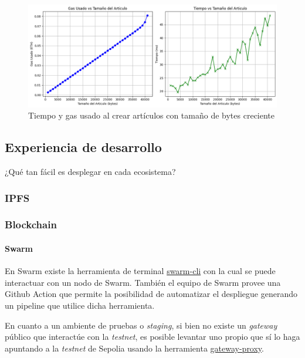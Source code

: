 \begin{figure}[H]
    \centering
    \includegraphics[width=1\linewidth]{img/aw-eth-bytes-articulo-incremental.png}
    \caption{Tiempo y gas usado al crear artículos con tamaño de bytes creciente}
    \label{fig:aw-eth-bytes-articulo-incremental.png}
\end{figure}

\subsection{Experiencia de desarrollo} %

¿Qué tan fácil es desplegar en cada ecosistema?

\subsubsection{IPFS}

\subsubsection{Blockchain}

\paragraph{Swarm}
En Swarm existe la herramienta de terminal \href{https://github.com/ethersphere/swarm-cli}{swarm-cli} con la cual se puede interactuar con un nodo de Swarm. También el equipo de Swarm provee una Github Action que permite la posibilidad de automatizar el despliegue generando un pipeline que utilice dicha herramienta.

En cuanto a un ambiente de pruebas o \textit{staging}, si bien no existe un \textit{gateway} público que interactúe con la \textit{testnet}, es posible levantar uno propio que sí lo haga apuntando a la \textit{testnet} de Sepolia usando la herramienta \href{https://github.com/ethersphere/gateway-proxy}{gateway-proxy}.

